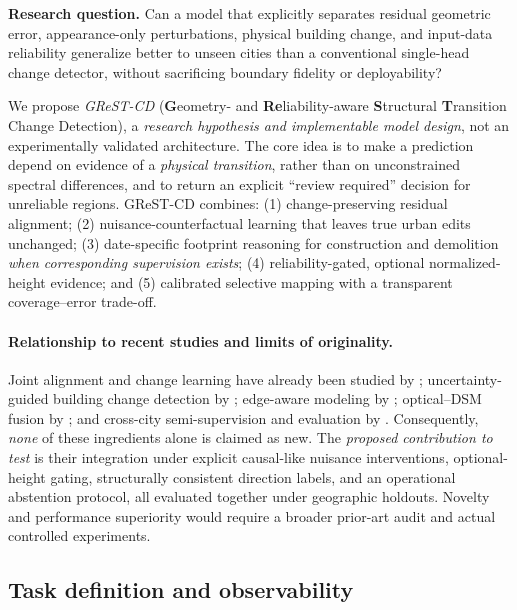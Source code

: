 \documentclass[11pt,a4paper]{article}
\begin{document}
\textbf{Research question.} Can a model that explicitly separates residual geometric error, appearance-only perturbations, physical building change, and input-data reliability generalize better to unseen cities than a conventional single-head change detector, without sacrificing boundary fidelity or deployability?

We propose \emph{GReST-CD} (\textbf{G}eometry- and \textbf{Re}liability-aware \textbf{S}tructural \textbf{T}ransition Change Detection), a \emph{research hypothesis and implementable model design}, not an experimentally validated architecture. The core idea is to make a prediction depend on evidence of a \emph{physical transition}, rather than on unconstrained spectral differences, and to return an explicit ``review required'' decision for unreliable regions. GReST-CD combines: (1) change-preserving residual alignment; (2) nuisance-counterfactual learning that leaves true urban edits unchanged; (3) date-specific footprint reasoning for construction and demolition \emph{when corresponding supervision exists}; (4) reliability-gated, optional normalized-height evidence; and (5) calibrated selective mapping with a transparent coverage--error trade-off.

\paragraph{Relationship to recent studies and limits of originality.} Joint alignment and change learning have already been studied by \citet{Lu2026}; uncertainty-guided building change detection by \citet{LiUncertainty2025}; edge-aware modeling by \citet{Holail2025}; optical--DSM fusion by \citet{Fu2025}; and cross-city semi-supervision and evaluation by \citet{Srivastava2026}. Consequently, \emph{none} of these ingredients alone is claimed as new. The \emph{proposed contribution to test} is their integration under explicit causal-like nuisance interventions, optional-height gating, structurally consistent direction labels, and an operational abstention protocol, all evaluated together under geographic holdouts. Novelty and performance superiority would require a broader prior-art audit and actual controlled experiments.

\subsection{Task definition and observability}
\end{document}
